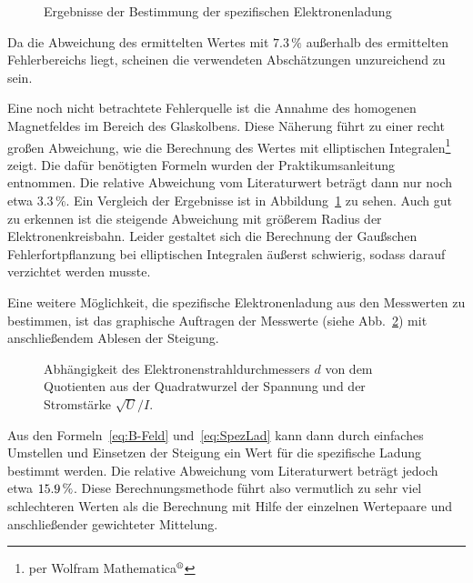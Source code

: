 \begin{figure}[htb]
\begin{center}
\def\svgwidth{10cm}

\end{center}
\caption{Ergebnisse der Bestimmung der spezifischen Elektronenladung}
\label{fig:ergebnisse}
\end{figure}
Da die Abweichung des ermittelten Wertes mit $7.3\,\%$ außerhalb des ermittelten Fehlerbereichs liegt, scheinen die verwendeten Abschätzungen unzureichend zu sein.

Eine noch nicht betrachtete Fehlerquelle ist die Annahme des homogenen Magnetfeldes im Bereich des Glaskolbens.
Diese Näherung führt zu einer recht großen Abweichung, wie die Berechnung des Wertes mit elliptischen Integralen\footnote{per Wolfram Mathematica$^\text{\textregistered}$} zeigt. Die dafür benötigten Formeln wurden der Praktikumsanleitung \citep[S.~108]{Anleitung} entnommen.
Die relative Abweichung vom Literaturwert beträgt dann nur noch etwa $3.3\,\%$. Ein Vergleich der Ergebnisse ist in Abbildung~\ref{fig:ergebnisse} zu sehen. Auch gut zu erkennen ist die steigende Abweichung mit größerem Radius der Elektronenkreisbahn.
Leider gestaltet sich die Berechnung der Gaußschen Fehlerfortpflanzung bei elliptischen Integralen äußerst schwierig, sodass darauf verzichtet werden musste.

Eine weitere Möglichkeit, die spezifische Elektronenladung aus den Messwerten zu bestimmen, ist das graphische Auftragen der Messwerte (siehe Abb.~\ref{fig:dUI-Kackplot}) mit anschließendem Ablesen der Steigung.
\begin{figure}[htb]
\begin{center}
\def\svgwidth{8cm}

\end{center}
\caption{Abhängigkeit des Elektronenstrahldurchmessers $d$ von dem Quotienten aus der Quadratwurzel der Spannung und der Stromstärke $\sqrt{U}/I$.}
\label{fig:dUI-Kackplot}
\end{figure}
Aus den Formeln~\ref{eq:B-Feld} und~\ref{eq:SpezLad} kann dann durch einfaches Umstellen und Einsetzen der Steigung ein Wert für die spezifische Ladung bestimmt werden.
Die relative Abweichung vom Literaturwert beträgt jedoch etwa $\unit[15.9]{\%}$.
Diese Berechnungsmethode führt also vermutlich zu sehr viel schlechteren Werten als die Berechnung mit Hilfe der einzelnen Wertepaare und anschließender gewichteter Mittelung.

